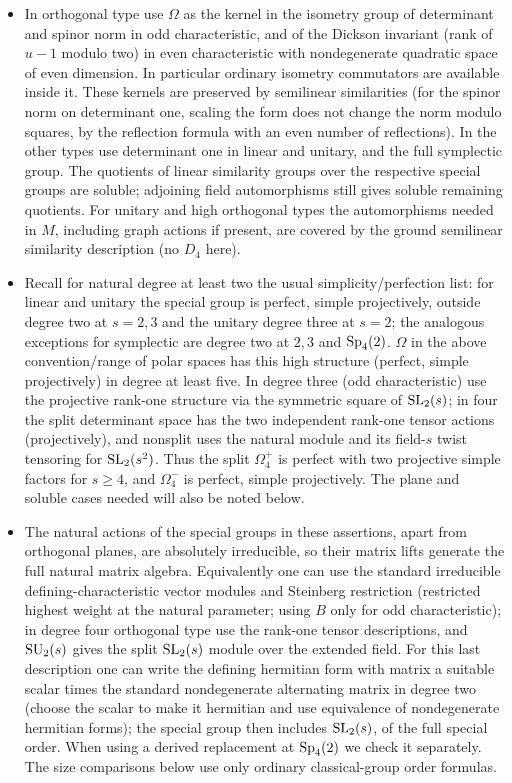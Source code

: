 \begin{convention}
\begin{itemize}
\item In orthogonal type use \(\Omega\) as the kernel in the isometry group of determinant and spinor norm in odd characteristic, and of the Dickson invariant (rank of \(u-1\) modulo two) in even characteristic with nondegenerate quadratic space of even dimension. In particular ordinary isometry commutators are available inside it. These kernels are preserved by semilinear similarities (for the spinor norm on determinant one, scaling the form does not change the norm modulo squares, by the reflection formula with an even number of reflections). In the other types use determinant one in linear and unitary, and the full symplectic group. The quotients of linear similarity groups over the respective special groups are soluble; adjoining field automorphisms still gives soluble remaining quotients. For unitary and high orthogonal types the automorphisms needed in \(M\), including graph actions if present, are covered by the ground semilinear similarity description (no \(D_4\) here).
\item Recall for natural degree at least two the usual simplicity/perfection list: for linear and unitary the special group is perfect, simple projectively, outside degree two at \(s=2,3\) and the unitary degree three at \(s=2\); the analogous exceptions for symplectic are degree two at \(2,3\) and \({\rm Sp}_4(2)\). \(\Omega\) in the above convention/range of polar spaces has this high structure (perfect, simple projectively) in degree at least five. In degree three (odd characteristic) use the projective rank-one structure via the symmetric square of \({\rm SL}_2(s)\); in four the split determinant space has the two independent rank-one tensor actions (projectively), and nonsplit uses the natural module and its field-\(s\) twist tensoring for \({\rm SL}_2(s^2)\). Thus the split \(\Omega_4^+\) is perfect with two projective simple factors for \(s\ge4\), and \(\Omega_4^-\) is perfect, simple projectively. The plane and soluble cases needed will also be noted below.
\item The natural actions of the special groups in these assertions, apart from orthogonal planes, are absolutely irreducible, so their matrix lifts generate the full natural matrix algebra. Equivalently one can use the standard irreducible defining-characteristic vector modules and Steinberg restriction (restricted highest weight at the natural parameter; using \(B\) only for odd characteristic); in degree four orthogonal type use the rank-one tensor descriptions, and \({\rm SU}_2(s)\) gives the split \({\rm SL}_2(s)\) module over the extended field. For this last description one can write the defining hermitian form with matrix a suitable scalar times the standard nondegenerate alternating matrix in degree two (choose the scalar to make it hermitian and use equivalence of nondegenerate hermitian forms); the special group then includes \({\rm SL}_2(s)\), of the full special order. When using a derived replacement at \({\rm Sp}_4(2)\) we check it separately. The size comparisons below use only ordinary classical-group order formulas.

\end{itemize}
\end{convention}
